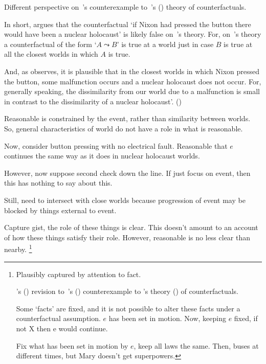 \begin{note}
  Different perspective on~\citeauthor{Fine:1975tj}'s counterexample to~\citeauthor{Lewis:1973th}'s (\citeyear{Lewis:1973th}) theory of counterfactuals.

  In short, \citeauthor{Fine:1975tj} argues that the counterfactual `if Nixon had pressed the button there would have been a nuclear holocaust' is likely false on~\citeauthor{Lewis:1973th}'s theory.
  For, on~\citeauthor{Lewis:1973th}'s theory a counterfactual of the form `\(A \leadsto B\)' is true at a world just in case \(B\) is true at all the closest worlds in which \(A\) is true.

  And, as \citeauthor{Fine:1975tj} observes, it is plausible that in the closest worlds in which Nixon pressed the button, some malfunction occurs and a nuclear holocaust does not occur.
  For, generally speaking, the dissimilarity from our world due to a malfunction is small in contrast to the dissimilarity of a nuclear holocaust'.
  (\citeyear[452]{Fine:1975tj})

  Reasonable is constrained by the event, rather than similarity between worlds.
  So, general characteristics of world do not have a role in what is reasonable.

  Now, consider button pressing with no electrical fault.
  Reasonable that \(e\) continues the same way as it does in nuclear holocaust worlds.

  However, now suppose second check down the line.
  If just focus on event, then this has nothing to say about this.
\end{note}

\begin{note}
  Still, need to intersect with close worlds because progression of event may be blocked by things external to event.
\end{note}

\begin{note}
  Capture gist, the role of these things is clear.
  This doesn't amount to an account of how these things satisfy their role.
  However, reasonable is no less clear than nearby.%
  \footnote{
    \color{red}
    Plausibly captured by attention to fact.

  \citeauthor{Veltman:2005tj}'s (\citeyear{Veltman:2005tj}) revision to~\citeauthor{Tichy:1976tp}'s (\citeyear{Tichy:1976tp}) counterexample to \citeauthor{Lewis:1973th}'s theory (\citeyear{Lewis:1973th}) of counterfactuals.

  Some `facts' are fixed, and it is not possible to alter these facts under a counterfactual assumption.
  \(e\) has been set in motion.
  Now, keeping \(e\) fixed, if not X then e would continue.

  Fix what has been set in motion by \(e\), keep all laws the same.
  Then, buses at different times, but Mary doesn't get superpowers.
  }
\end{note}

